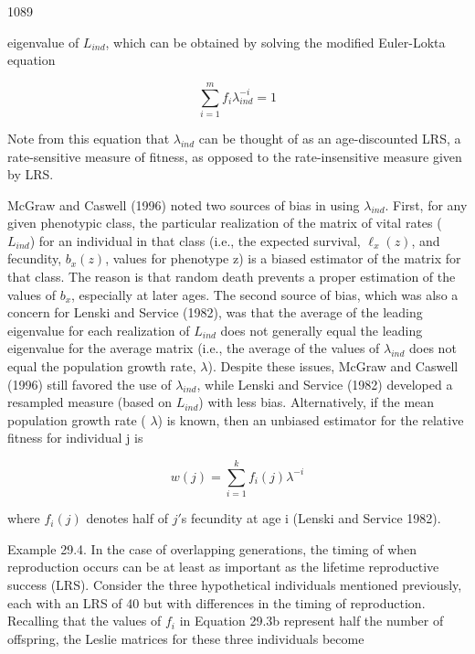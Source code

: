 \documentclass{article}
\begin{document}
1089

eigenvalue of  $ L_{ind} $, which can be obtained by solving the modified Euler-Lokta equation

\begin{equation}
\sum_{i=1}^{m}f_{i}\lambda_{ind}^{-i}=1
\tag{29.3c}
\label{eq:29_3c}
\end{equation}

Note from this equation that  $ \lambda_{ind} $ can be thought of as an age-discounted LRS, a rate-sensitive measure of fitness, as opposed to the rate-insensitive measure given by LRS.

McGraw and Caswell (1996) noted two sources of bias in using  $ \lambda_{ind} $. First, for any given phenotypic class, the particular realization of the matrix of vital rates ( $ L_{ind} $) for an individual in that class (i.e., the expected survival,  $ \ell_x(z) $, and fecundity,  $ b_x(z) $, values for phenotype z) is a biased estimator of the matrix for that class. The reason is that random death prevents a proper estimation of the values of  $ b_x $, especially at later ages. The second source of bias, which was also a concern for Lenski and Service (1982), was that the average of the leading eigenvalue for each realization of  $ L_{ind} $ does not generally equal the leading eigenvalue for the average matrix (i.e., the average of the values of  $ \lambda_{ind} $ does not equal the population growth rate,  $ \lambda $). Despite these issues, McGraw and Caswell (1996) still favored the use of  $ \lambda_{ind} $, while Lenski and Service (1982) developed a resampled measure (based on  $ L_{ind} $) with less bias. Alternatively, if the mean population growth rate ( $ \lambda $) is known, then an unbiased estimator for the relative fitness for individual j is

\begin{equation}
w(j)=\sum_{i=1}^{k}f_{i}(j)\lambda^{-i}
\tag{29.3d}
\label{eq:29_3d}
\end{equation}

where  $ f_{i}(j) $ denotes half of  $ j' $s fecundity at age i (Lenski and Service 1982).

Example 29.4. In the case of overlapping generations, the timing of when reproduction occurs can be at least as important as the lifetime reproductive success (LRS). Consider the three hypothetical individuals mentioned previously, each with an LRS of 40 but with differences in the timing of reproduction. Recalling that the values of  $ f_i $ in Equation 29.3b represent half the number of offspring, the Leslie matrices for these three individuals become
\end{document}
